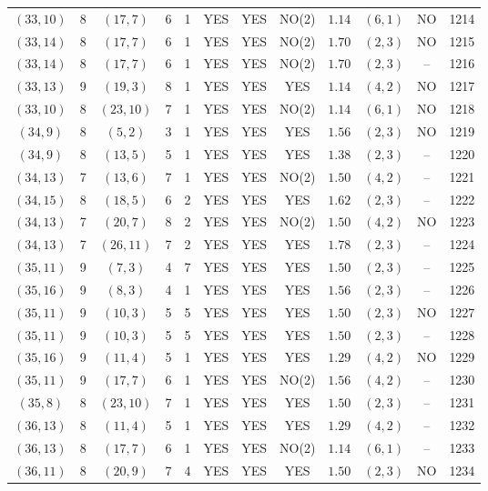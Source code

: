 \begin{longtable}{|c|c|c|c|c|c|c|c|c|c|c|c|}
$(33,10)$ & 8 & $(17,7)$ & 6 & 1 & YES & YES & NO(2) & $1.14$ & $(6,1)$ & NO & 1214\\
$(33,14)$ & 8 & $(17,7)$ & 6 & 1 & YES & YES & NO(2) & $1.70$ & $(2,3)$ & NO & 1215\\
$(33,14)$ & 8 & $(17,7)$ & 6 & 1 & YES & YES & NO(2) & $1.70$ & $(2,3)$ & -- & 1216\\
$(33,13)$ & 9 & $(19,3)$ & 8 & 1 & YES & YES & YES & $1.14$ & $(4,2)$ & NO & 1217\\
$(33,10)$ & 8 & $(23,10)$ & 7 & 1 & YES & YES & NO(2) & $1.14$ & $(6,1)$ & NO & 1218\\
$(34,9)$ & 8 & $(5,2)$ & 3 & 1 & YES & YES & YES & $1.56$ & $(2,3)$ & NO & 1219\\
$(34,9)$ & 8 & $(13,5)$ & 5 & 1 & YES & YES & YES & $1.38$ & $(2,3)$ & -- & 1220\\
$(34,13)$ & 7 & $(13,6)$ & 7 & 1 & YES & YES & NO(2) & $1.50$ & $(4,2)$ & -- & 1221\\
$(34,15)$ & 8 & $(18,5)$ & 6 & 2 & YES & YES & YES & $1.62$ & $(2,3)$ & -- & 1222\\
$(34,13)$ & 7 & $(20,7)$ & 8 & 2 & YES & YES & NO(2) & $1.50$ & $(4,2)$ & NO & 1223\\
$(34,13)$ & 7 & $(26,11)$ & 7 & 2 & YES & YES & YES & $1.78$ & $(2,3)$ & -- & 1224\\
$(35,11)$ & 9 & $(7,3)$ & 4 & 7 & YES & YES & YES & $1.50$ & $(2,3)$ & -- & 1225\\
$(35,16)$ & 9 & $(8,3)$ & 4 & 1 & YES & YES & YES & $1.56$ & $(2,3)$ & -- & 1226\\
$(35,11)$ & 9 & $(10,3)$ & 5 & 5 & YES & YES & YES & $1.50$ & $(2,3)$ & NO & 1227\\
$(35,11)$ & 9 & $(10,3)$ & 5 & 5 & YES & YES & YES & $1.50$ & $(2,3)$ & -- & 1228\\
$(35,16)$ & 9 & $(11,4)$ & 5 & 1 & YES & YES & YES & $1.29$ & $(4,2)$ & NO & 1229\\
$(35,11)$ & 9 & $(17,7)$ & 6 & 1 & YES & YES & NO(2) & $1.56$ & $(4,2)$ & -- & 1230\\
$(35,8)$ & 8 & $(23,10)$ & 7 & 1 & YES & YES & YES & $1.50$ & $(2,3)$ & -- & 1231\\
$(36,13)$ & 8 & $(11,4)$ & 5 & 1 & YES & YES & YES & $1.29$ & $(4,2)$ & -- & 1232\\
$(36,13)$ & 8 & $(17,7)$ & 6 & 1 & YES & YES & NO(2) & $1.14$ & $(6,1)$ & -- & 1233\\
$(36,11)$ & 8 & $(20,9)$ & 7 & 4 & YES & YES & YES & $1.50$ & $(2,3)$ & NO & 1234\\

\end{longtable}
